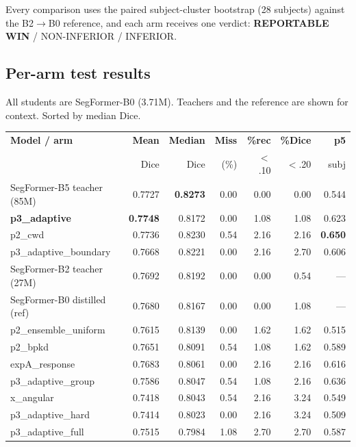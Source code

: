 \documentclass[11pt]{article}
\newcommand{\win}[1]{\textcolor{wingreen}{\textbf{#1}}}
\newcommand{\lose}[1]{\textcolor{losered}{#1}}
\begin{document}
Every comparison uses the paired subject-cluster bootstrap (28 subjects) against the B2$\to$B0
reference, and each arm receives one verdict:
\win{REPORTABLE WIN} / NON-INFERIOR / \lose{INFERIOR}.

\subsection{Per-arm test results}

All students are SegFormer-B0 (3.71M). Teachers and the reference are shown for context.
Sorted by median Dice.

\begin{center}\footnotesize
\begin{tabular}{>{\raggedright\arraybackslash}p{4.7cm} n n n n n n}
\toprule
\textbf{Model / arm} & \textbf{Mean} & \textbf{Median} & \textbf{Miss} & \textbf{\%rec} &
\textbf{\%Dice} & \textbf{p5} \\
 & Dice & Dice & (\%) & $<$.10 & $<$.20 & subj \\
\midrule
SegFormer-B5 teacher (85M)   & 0.7727 & \textbf{0.8273} & 0.00 & 0.00 & 0.00 & 0.544 \\
\win{p3\_adaptive}           & \win{0.7748} & 0.8172 & 0.00 & 1.08 & 1.08 & 0.623 \\
p2\_cwd                      & 0.7736 & 0.8230 & 0.54 & 2.16 & 2.16 & \textbf{0.650} \\
p3\_adaptive\_boundary       & 0.7668 & 0.8221 & 0.00 & 2.16 & 2.70 & 0.606 \\
SegFormer-B2 teacher (27M)   & 0.7692 & 0.8192 & 0.00 & 0.00 & 0.54 & --- \\
SegFormer-B0 distilled (ref) & 0.7680 & 0.8167 & 0.00 & 0.00 & 1.08 & --- \\
p2\_ensemble\_uniform        & 0.7615 & 0.8139 & 0.00 & 1.62 & 1.62 & 0.515 \\
p2\_bpkd                     & 0.7651 & 0.8091 & 0.54 & 1.08 & 1.62 & 0.589 \\
expA\_response               & 0.7683 & 0.8061 & 0.00 & 2.16 & 2.16 & 0.616 \\
p3\_adaptive\_group          & 0.7586 & 0.8047 & 0.54 & 1.08 & 2.16 & 0.636 \\
x\_angular                   & 0.7418 & 0.8043 & 0.54 & 2.16 & 3.24 & 0.549 \\
p3\_adaptive\_hard           & 0.7414 & 0.8023 & 0.00 & 2.16 & 3.24 & 0.509 \\
p3\_adaptive\_full           & 0.7515 & 0.7984 & 1.08 & 2.70 & 2.70 & 0.587 \\
\bottomrule
\end{tabular}
\end{center}
\end{document}
